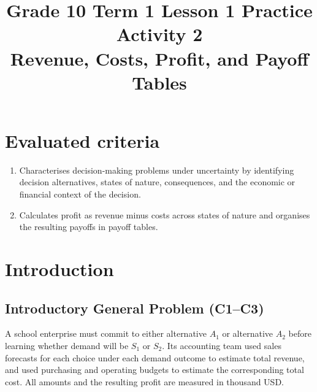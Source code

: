 \makeatletter
{}
\makeatother



\title{Grade 10 Term 1 Lesson 1 Practice Activity 2\\Revenue, Costs, Profit, and Payoff Tables}
\author{}
\date{}


	\maketitle

	\setcounter{tocdepth}{1}
	\setcounter{secnumdepth}{2}
	\label{toc}
	\tableofcontents

	\section*{Evaluated criteria}
	\begin{enumerate}[label=\textbf{C\arabic*}]
		\item Characterises decision-making problems under uncertainty by identifying decision alternatives, states of nature, consequences, and the economic or financial context of the decision.
		\item[\textbf{C3}] Calculates profit as revenue minus costs across states of nature and organises the resulting payoffs in payoff tables.
	\end{enumerate}

	\section{Introduction}
	\label{sec:introduction}


	\subsection{Introductory General Problem (C1--C3)}
	\label{sec:problem1-introductory-general-c1-c3}

	A school enterprise must commit to either alternative \(A_1\) or alternative \(A_2\) before learning whether demand will be \(S_1\) or \(S_2\). Its accounting team used sales forecasts for each choice under each demand outcome to estimate total revenue, and used purchasing and operating budgets to estimate the corresponding total cost. All amounts and the resulting profit are measured in thousand USD.

